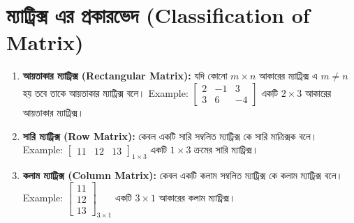 \section{ম্যাট্রিক্স এর প্রকারভেদ (Classification of Matrix)}
\begin{enumerate}
	\item \textbf{আয়তাকার ম্যাট্রিক্স (Rectangular Matrix):} যদি কোনো $m \times n$ আকারের ম্যাট্রিক্স এ $m\neq n$ হয় তবে তাকে আয়তাকার ম্যাট্রিক্স বলে। Example: 
	$\left[\begin{array}{rrr}
		2 & -1 & 3 \\
		3 & 6 & -4
	\end{array}\right]$ একটি $2 \times 3$ আকারের আয়তাকার ম্যাট্রিক্স।
	
	\item \textbf{সারি ম্যাট্রিক্স (Row Matrix):} কেবল একটি সারি সম্বলিত ম্যাট্রিক্স কে সারি মাত্রিক্সক বলে। Example: 
	$\left[\begin{array}{ccc}
	11 & 12 & 13
	\end{array}\right]_{1 \times 3}$ একটি $1 \times 3$ ক্রমের সারি ম্যাট্রিক্স।
	
	\item \textbf{কলাম ম্যাট্রিক্স (Column Matrix):} কেবল একটি কলাম সম্বলিত ম্যাট্রিক্স কে কলাম ম্যাট্রিক্স বলে। Example: 
	$\left[\begin{array}{c}
	11 \\ 12 \\ 13
	\end{array}\right]_{3 \times 1}$ একটি $3 \times 1$ আকারের কলাম ম্যাট্রিক্স।
	

\end{enumerate}
